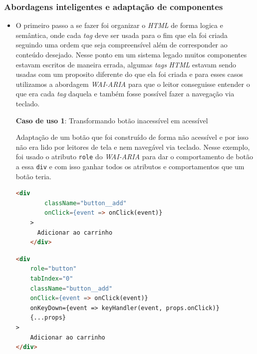 \subsubsection{Abordagens inteligentes e adaptação de componentes}
{\begin{itemize}
    \item O primeiro passo a se fazer foi organizar o \textit{HTML} \cite{HTML} de forma logica e semântica, onde cada \textit{tag} deve ser usada para o fim que ela foi criada seguindo uma ordem que seja compreensível além de corresponder ao conteúdo desejado. Nesse ponto em um sistema legado muitos componentes estavam escritos de maneira errada, algumas \textit{tags} \textit{HTML} \cite{HTML} estavam sendo usadas com um proposito diferente do que ela foi criada e para esses casos utilizamos a abordagem \textit{WAI-ARIA} \cite{WAI-ARIA} para que o leitor conseguisse entender o que era cada \textit{tag} daquela e também fosse possível fazer a navegação via teclado.

\vspace{1.5cm}
{\centerline{\textbf{Caso de uso 1}: Transformando botão inacessível em acessível} 
Adaptação de um botão que foi construído de forma não acessível e por isso não era lido por leitores de tela e nem navegável via teclado. Nesse exemplo, foi usado o atributo \lstinline{role} do \textit{WAI-ARIA}\cite{WAI-ARIA} para dar o comportamento de botão a essa \lstinline{div} e com isso ganhar todos os atributos e comportamentos que um botão teria.

\begin{lstlisting}[language=html, caption=Componente de botão antes de receber boas praticas e acessibilidade]
    <div
        className="button__add"
        onClick={event => onClick(event)}
    >
      Adicionar ao carrinho 
    </div>
\end{lstlisting}}
{\begin{lstlisting}[language=html,caption=Adaptação do componente de botão usando \textit{WAI-ARIA} \cite{WAI-ARIA}]
<div 
    role="button" 
    tabIndex="0" 
    className="button__add"
    onClick={event => onClick(event)}
    onKeyDown={event => keyHandler(event, props.onClick)}
    {...props}
>
    Adicionar ao carrinho
</div>
 
\end{lstlisting}}


\end{itemize}}
